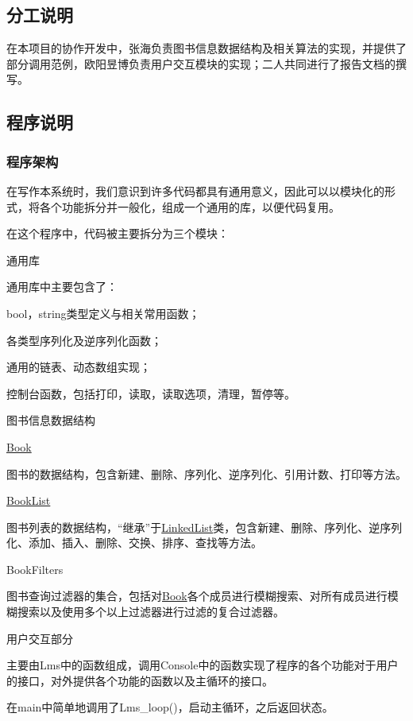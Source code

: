 \subsection*{分工说明}

在本项目的协作开发中，张海负责图书信息数据结构及相关算法的实现，并提供了部分调用范例，欧阳昱博负责用户交互模块的实现；二人共同进行了报告文档的撰写。

\subsection*{程序说明}

\subsubsection*{程序架构}

在写作本系统时，我们意识到许多代码都具有通用意义，因此可以以模块化的形式，将各个功能拆分并一般化，组成一个通用的库，以便代码复用。

在这个程序中，代码被主要拆分为三个模块：


\begin{DoxyEnumerate}
\item 通用库

通用库中主要包含了：
\begin{DoxyItemize}
\item {\ttfamily bool}，{\ttfamily string}类型定义与相关常用函数；
\item 各类型序列化及逆序列化函数；
\item 通用的链表、动态数组实现；
\item 控制台函数，包括打印，读取，读取选项，清理，暂停等。
\end{DoxyItemize}
\item 图书信息数据结构
\begin{DoxyItemize}
\item {\ttfamily \hyperlink{structBook}{Book}}

图书的数据结构，包含新建、删除、序列化、逆序列化、引用计数、打印等方法。
\item {\ttfamily \hyperlink{structBookList}{Book\-List}}

图书列表的数据结构，“继承”于{\ttfamily \hyperlink{structLinkedList}{Linked\-List}}类，包含新建、删除、序列化、逆序列化、添加、插入、删除、交换、排序、查找等方法。
\item {\ttfamily Book\-Filters}

图书查询过滤器的集合，包括对{\ttfamily \hyperlink{structBook}{Book}}各个成员进行模糊搜索、对所有成员进行模糊搜索以及使用多个以上过滤器进行过滤的复合过滤器。
\end{DoxyItemize}
\item 用户交互部分

主要由{\ttfamily Lms}中的函数组成，调用{\ttfamily Console}中的函数实现了程序的各个功能对于用户的接口，对外提供各个功能的函数以及主循环的接口。

在{\ttfamily main}中简单地调用了{\ttfamily Lms\-\_\-loop()}，启动主循环，之后返回状态{}。
\end{DoxyEnumerate}

